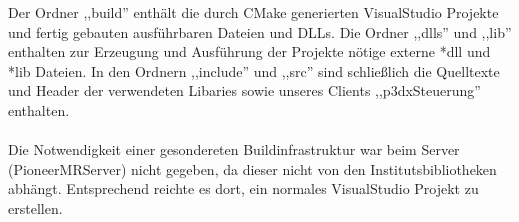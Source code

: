 Der Ordner ,,build'' enthält die durch CMake generierten VisualStudio
Projekte und fertig gebauten ausführbaren Dateien und DLLs. Die Ordner
,,dlls'' und ,,lib'' enthalten zur Erzeugung und Ausführung der
Projekte nötige externe *dll und *lib Dateien. In den Ordnern
,,include'' und ,,src'' sind schließlich die Quelltexte und Header der
verwendeten Libaries sowie unseres Clients ,,p3dxSteuerung''
enthalten. \\\\
Die Notwendigkeit einer gesondereten Buildinfrastruktur war beim
Server (PioneerMRServer) nicht 
gegeben, da dieser nicht von den Institutsbibliotheken
abhängt. Entsprechend reichte es dort, ein normales VisualStudio Projekt
zu erstellen. 


